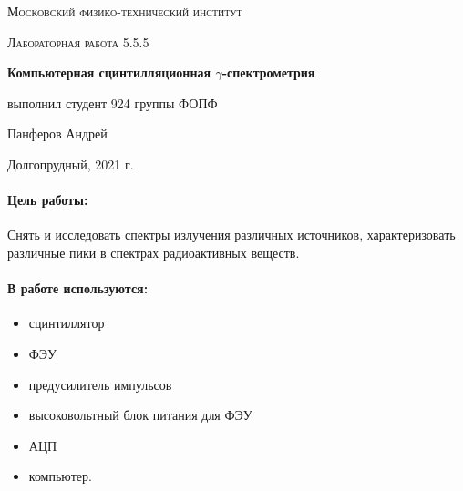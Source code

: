 \documentclass[a4paper, 12pt]{article}
\begin{document}
	
\begin{titlepage}
	\centering
	\vspace{5cm}
	{\scshape\LARGE Московский физико-технический институт \par}
	\vspace{4cm}
	{\scshape\Large Лабораторная работа 5.5.5 \par}
	\vspace{1cm}
	{\huge\bfseries Компьютерная сцинтилляционная $\gamma$-спектрометрия \par}
	\vspace{1cm}
	\vfill
\begin{flushright}
	{\large выполнил студент 924 группы ФОПФ}\par
	\vspace{0.3cm}
	{\LARGE Панферов Андрей}
\end{flushright}
	

	\vfill

	Долгопрудный, 2021 г.
\end{titlepage}

\paragraph*{Цель работы:} Снять и исследовать спектры излучения различных источников, характеризовать различные пики в спектрах радиоактивных веществ.

\paragraph*{В работе используются:}
\begin{itemize}
    \item сцинтиллятор
    \item ФЭУ
    \item предусилитель импульсов
    \item высоковольтный блок питания для ФЭУ
    \item АЦП
    \item компьютер.
\end{itemize}
\end{document}
